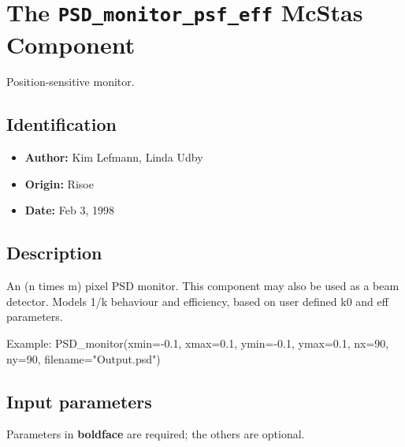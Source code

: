 \section{The \texttt{PSD\_monitor\_psf\_eff} McStas Component}
Position-sensitive monitor.

\subsection*{Identification}
\begin{itemize}
  \item \textbf{Author:} Kim Lefmann, Linda Udby
  \item \textbf{Origin:} Risoe
  \item \textbf{Date:} Feb 3, 1998
\end{itemize}

\subsection*{Description}
An (n times m) pixel PSD monitor. This component may also be used as a beam detector. Models 1/k behaviour and efficiency, based on user defined k0 and eff parameters.

Example: PSD\_monitor(xmin=-0.1, xmax=0.1, ymin=-0.1, ymax=0.1, nx=90, ny=90, filename="Output.psd")

\subsection*{Input parameters}
Parameters in \textbf{boldface} are required; the others are optional.

